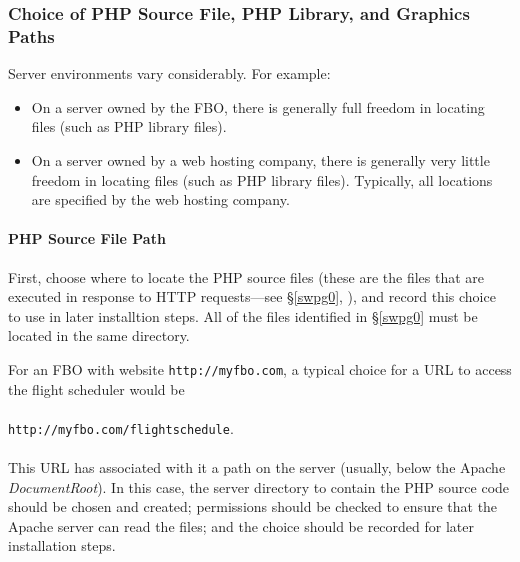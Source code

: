 \documentclass[letterpaper,10pt,titlepage]{article}
\begin{document}

\subsubsection{Choice of PHP Source File, PHP Library, and Graphics Paths}
\label{sins0:sssi0:spwg0}

Server environments vary considerably.  For example:

\begin{itemize}
\item On a server owned by the FBO, there is generally full freedom
      in locating files (such as 
      PHP library files).
\item On a server owned by a web hosting company, there is generally
      very little freedom in locating files (such as PHP library files).
      Typically, all locations are specified by the web hosting company.
\end{itemize}


\paragraph{PHP Source File Path}

First, choose where to locate the PHP source files (these are the files that
are executed in response to HTTP requests---see \S{}\ref{swpg0}, \pageref{swpg0}), and record this choice to use
in later installtion steps.  All of the files identified in \S{}\ref{swpg0} must be located in the
same directory.

For an FBO with website \texttt{http://myfbo.com}, a typical choice for a URL
to access the flight scheduler would be\\\\
\texttt{http://myfbo.com/flightschedule}.\\\\
This URL has associated with it a path on the server (usually, below the 
Apache 
%
\emph{DocumentRoot}).
In this case, the server directory to contain the PHP source code should be chosen and created;
permissions should be checked to ensure that the Apache server
can read the files; and the choice should be recorded for later installation steps.
\end{document}
